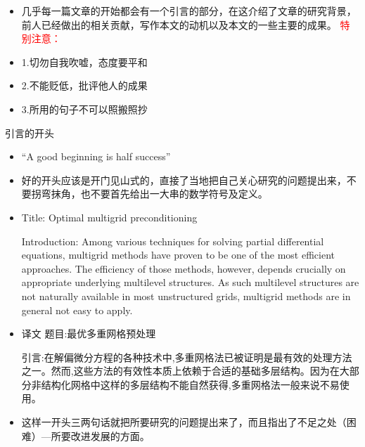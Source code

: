 \documentclass[13pt]{ctexbeamer}
\newcommand{\red}[1]{\textcolor{red}{#1}}
\begin{document}
\begin{frame}
    \begin{itemize}
        \item
        几乎每一篇文章的开始都会有一个引言的部分，在这介绍了文章的研究背景，前人已经做出的相关贡献，写作本文的动机以及本文的一些主要的成果。
        \newline
        \red{特别注意：}
        \item1.切勿自我吹嘘，态度要平和
        \item2.不能贬低，批评他人的成果
        \item3.所用的句子不可以照搬照抄

    \end{itemize}
\end{frame}

\begin{frame}{引言的开头}

    \begin{itemize}
        \item
        “A good beginning is half success”

        \item 好的开头应该是开门见山式的，直接了当地把自己关心研究的问题提出来，不要拐弯抹角，也不要首先给出一大串的数学符号及定义。

    \end{itemize}
\end{frame}

\begin{frame}

    \begin{itemize}
        \item
        {\small  Title: Optimal multigrid preconditioning}


        {\small Introduction: Among various techniques for solving partial differential equations,  multigrid methods have proven to be one of the most efficient approaches. The efficiency of those methods, however, depends crucially on appropriate underlying multilevel structures. As such multilevel structures are not naturally  available in most unstructured grids, multigrid methods are in general not easy to apply.}

        \pause
        \item {\small  译文 \quad  题目:最优多重网格预处理}

        {\small  引言:在解偏微分方程的各种技术中,多重网格法已被证明是最有效的处理方法之一。然而,这些方法的有效性本质上依赖于合适的基础多层结构。因为在大部分非结构化网格中这样的多层结构不能自然获得,多重网格法一般来说不易使用。}
        \item 这样一开头三两句话就把所要研究的问题提出来了，而且指出了不足之处（困难）---所要改进发展的方面。
    \end{itemize}
\end{frame}
\end{document}
